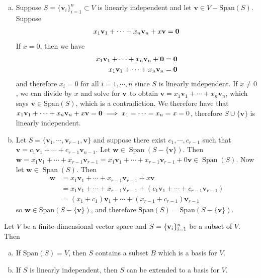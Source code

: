 \documentclass[12pt,letterpaper,reqno]{article}
\numberwithin{equation}{section}
\newcommand{\bv}{\mathbf{v}}
\newcommand{\bw}{\mathbf{w}}
\DeclareMathOperator{\Span}{Span}
\begin{document}
\begin{pf}
	\begin{enumerate}[(a)]
		\item Suppose $S=\{\bv_i\}_{i=1}^n \subset V$ is linearly independent and let $\bv \in V-\text{Span}(S)$. Suppose 
		\begin{align*}
			x_1\bv_1+\cdots+x_n\bv_n+x\bv={\bf 0} 
		\end{align*}
If $x=0$, then we have
\begin{align*}
			x_1\bv_1+\cdots+x_n\bv_n+{\bf 0}&={\bf 0}  \\
			x_1\bv_1+\cdots+x_n\bv_n &={\bf 0}  \\
		\end{align*}
and therefore $x_i=0$ for all $i=1,\cdots,n$ since $S$ is linearly independent. If $x \neq 0$, we can divide by $x$ and solve for ${\bf v}$ to obtain $\bv=x_1\bv_1+\cdots +x_n \bv_n$, which says $\bv \in \text{Span}(S)$, which is a contradiction. We therefore have that $x_1\bv_1+\cdots+x_n\bv_n+x\bv={\bf 0} \implies x_1=\cdots=x_n=x=0$, therefore $S\cup \{\bv \}$ is linearly independent. 
\item Let $S=\{\bv_1,\cdots, \bv_{r-1}, \bv\}$ and suppose there exist $c_1,\cdots,c_{r-1}$ such that $\bv=c_1\bv_1+\cdots+c_{r-1} \bv_{n-1}$.	Let $\bw \in \Span(S-\{\bv \})$. Then $\bw =x_1\bv_1+\cdots+x_{r-1}\bv_{r-1}=x_1\bv_1+\cdots+x_{r-1}\bv_{r-1}+0 \bv \in \Span(S)$. Now let $\bw \in \Span(S)$. Then 
\begin{align*}
	\bw&=x_1\bv_1+\cdots+x_{r-1}\bv_{r-1}+x\bv \\
	&=x_1\bv_1+\cdots+x_{r-1}\bv_{r-1}+(c_1\bv_1+\cdots+c_{r-1}\bv_{r-1}) \\
	&=(x_1+c_1)\bv_1+\cdots+(x_{r-1}+c_{r-1})\bv_{r-1}
\end{align*} 
so $\bw \in \text{Span}(S-\{\bv\})$, and therefore $\text{Span}(S)=\text{Span}(S-\{\bv\})$.
\end{enumerate}
\end{pf}

\begin{thm}
	Let $V$ be a finite-dimensional vector space and $S=\{{\bf v}_i\}_{i=1}^n$ be a subset of $V$. Then
\begin{enumerate}[(a)]
	\item If $\text{Span}(S)=V$, then $S$ contains a subset $B$ which is a basis for $V$.
	\item If $S$ is linearly independent, then $S$ can be extended to a basis for $V$. 
\end{enumerate}
\end{thm}
\end{document}
